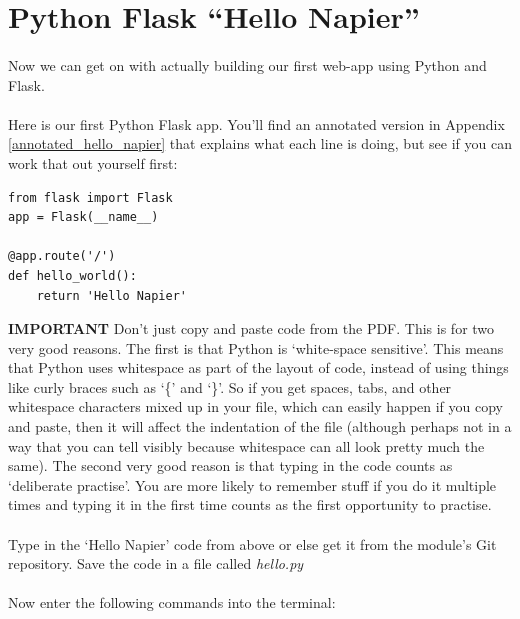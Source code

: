 \documentclass[12pt, a4paper, oneside]{book}
\begin{document}
\section{Python Flask ``Hello Napier''}
\label{hello-napier}

\paragraph{} Now we can get on with actually building our first web-app using Python and Flask.

\paragraph{} Here is our first Python Flask app. You'll find an annotated version in Appendix \ref{annotated_hello_napier} that explains what each line is doing, but see if you can work that out yourself first:

\begin{lstlisting}
from flask import Flask
app = Flask(__name__)

@app.route('/')
def hello_world():
    return 'Hello Napier'
\end{lstlisting}

\begin{framed}
\textbf{IMPORTANT} Don't just copy and paste code from the PDF. This is for two very good reasons. The first is that Python is `white-space sensitive'. This means that Python uses whitespace as part of the layout of code, instead of using things like curly braces such as `\{' and `\}'. So if you get spaces, tabs, and other whitespace characters mixed up in your file, which can easily happen if you copy and paste, then it will affect the indentation of the file (although perhaps not in a way that you can tell visibly because whitespace can all look pretty much the same). The second very good reason is that typing in the code counts as `deliberate practise'. You are more likely to remember stuff if you do it multiple times and typing it in the first time counts as the first opportunity to practise.
\end{framed}

\paragraph{} Type in the `Hello Napier' code from above or else get it from the module's Git repository. Save the code in a file called \emph{hello.py}

\paragraph{} Now enter the following commands into the terminal:
\end{document}
